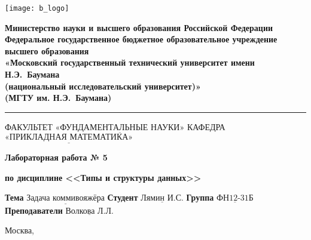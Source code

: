 \thispagestyle{empty}

\noindent \begin{minipage}{0.15\textwidth}
	\texttt{[image: b\_logo]}
\end{minipage}
\noindent\begin{minipage}{0.85\textwidth}\centering
	\textbf{Министерство науки и высшего образования Российской Федерации}\\
	\textbf{Федеральное государственное бюджетное образовательное учреждение высшего образования}\\
	\textbf{«Московский государственный технический университет имени Н.Э.~Баумана}\\
	\textbf{(национальный исследовательский университет)»}\\
	\textbf{(МГТУ им. Н.Э.~Баумана)}
\end{minipage}

\noindent\rule{\linewidth}{3pt}
\newline\newline
\noindent ФАКУЛЬТЕТ $\underline{\text{«ФУНДАМЕНТАЛЬНЫЕ НАУКИ»}}$ \newline\newline
\noindent КАФЕДРА $\underline{\text{«ПРИКЛАДНАЯ МАТЕМАТИКА»}}$

\vspace{1cm}

\begin{center}
	\noindent\centering
		\Large\textbf{Лабораторная работа № 5}
	
\end{center}
\begin{center}
	\noindent\centering
		\Large\textbf{по дисциплине <<Типы и структуры данных>>}
\end{center}

\noindent\textbf{Тема} $\underline{\text{Задача коммивояжёра}}$\newline\newline
\noindent\textbf{Студент} $\underline{\text{Лямин И.С.}}$\newline\newline
\noindent\textbf{Группа} $\underline{\text{ФН12-31Б}}$\newline\newline
\noindent\textbf{Преподаватели} $\underline{\text{Волкова Л.Л.}}$\newline

\begin{center}
	\vfill
	Москва,~\the\year 
\end{center}
\clearpage
